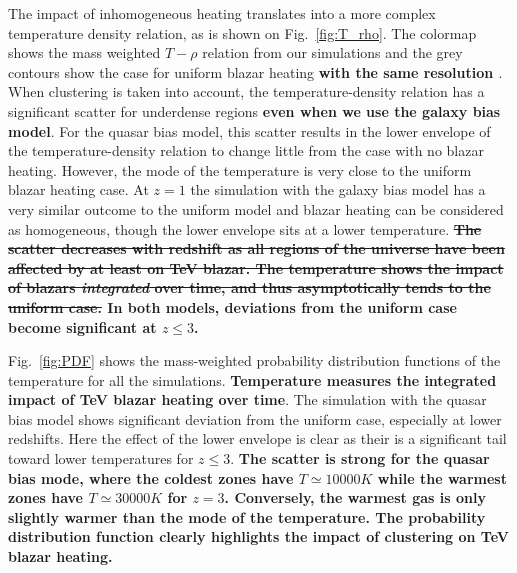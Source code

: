 \documentclass[twocolumns]{emulateapj}
\newcommand\ALc[1]{{\color{red} \bf #1}} %
\begin{document}
The impact of inhomogeneous heating translates into a more complex temperature density relation, as is shown on Fig.~\ref{fig:T_rho}. The colormap shows the mass weighted $T-\rho$ relation from our simulations and the grey contours show the case for uniform blazar heating  \ALc{with the same resolution \citep{2012MNRAS.423..149P}}. When clustering is taken into account, the temperature-density relation has a significant scatter for underdense regions \ALc{even when we use the galaxy bias model}. For the quasar bias model, this scatter results in the lower envelope of the temperature-density relation to change little from the case with no blazar heating.  However, the mode of the temperature is very close to the uniform blazar heating case. At $z=1$ the simulation with the galaxy bias model has a very similar outcome to the uniform model and  blazar heating can be considered as homogeneous, though the lower envelope sits at a lower temperature.  \ALc{\sout{The scatter decreases with redshift as all regions of the universe have been affected by at least on TeV blazar. The temperature shows the impact of blazars \textit{integrated} over time, and thus asymptotically tends to the uniform case. } In both models, deviations from the uniform case become significant at $z\leqslant 3$.}





Fig.~\ref{fig:PDF} shows the mass-weighted probability distribution functions of the temperature for all the simulations. \ALc{Temperature measures the integrated impact of TeV blazar heating over time}. The simulation with the quasar bias model shows significant deviation from the uniform case, especially at lower redshifts. Here the effect of the lower envelope is clear as their is a significant tail toward lower temperatures for $z \leqslant 3$. \ALc{The scatter is strong for the quasar bias mode, where the coldest zones have $T\simeq 10 000K$ while the warmest zones have $T\simeq 30 000K$ for $z=3$. Conversely, the warmest gas is only slightly warmer than the mode of the temperature. The probability distribution function clearly highlights the impact of clustering on TeV blazar heating.}
\end{document}
